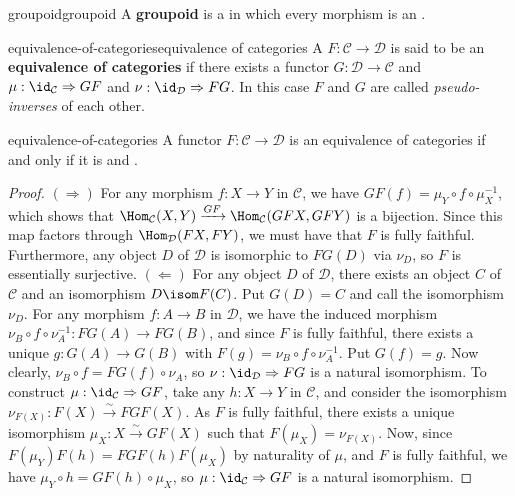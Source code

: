 \begin{topic}{groupoid}{groupoid}
    A \textbf{groupoid} is a  in which every morphism is an .
\end{topic}

\begin{topic}{equivalence-of-categories}{equivalence of categories}
    A  $F : \mathcal{C} \to \mathcal{D}$ is said to be an \textbf{equivalence of categories} if there exists a functor $G : \mathcal{D} \to \mathcal{C}$ and  $\mu : \id_\mathcal{C} \Rightarrow GF$ and $\nu : \id_\mathcal{D} \Rightarrow FG$. In this case $F$ and $G$ are called \textit{pseudo-inverses} of each other.
\end{topic}

\begin{example}{equivalence-of-categories}
    A functor $F : \mathcal{C} \to \mathcal{D}$ is an equivalence of categories if and only if it is   and .
    \begin{proof}
        $(\Rightarrow)$ For any morphism $f : X \to Y$ in $\mathcal{C}$, we have $GF(f) = \mu_Y \circ f \circ \mu_X^{-1}$, which shows that $\Hom_\mathcal{C}(X, Y) \xrightarrow{GF} \Hom_\mathcal{C}(GFX, GFY)$ is a bijection. Since this map factors through $\Hom_\mathcal{D}(FX, FY)$, we must have that $F$ is fully faithful. Furthermore, any object $D$ of $\mathcal{D}$ is isomorphic to $FG(D)$ via $\nu_D$, so $F$ is essentially surjective.
        $(\Leftarrow)$ For any object $D$ of $\mathcal{D}$, there exists an object $C$ of $\mathcal{C}$ and an isomorphism $D \isom F(C)$. Put $G(D) = C$ and call the isomorphism $\nu_D$. For any morphism $f : A \to B$ in $\mathcal{D}$, we have the induced morphism $\nu_B \circ f \circ \nu_A^{-1} : FG(A) \to FG(B)$, and since $F$ is fully faithful, there exists a unique $g : G(A) \to G(B)$ with $F(g) = \nu_B \circ f \circ \nu_A^{-1}$. Put $G(f) = g$. Now clearly, $\nu_B \circ f = FG(f) \circ \nu_A$, so $\nu : \id_\mathcal{D} \Rightarrow FG$ is a natural isomorphism. To construct $\mu : \id_\mathcal{C} \Rightarrow GF$, take any $h : X \to Y$ in $\mathcal{C}$, and consider the isomorphism $\nu_{F(X)} : F(X) \xrightarrow{\sim} FGF(X)$. As $F$ is fully faithful, there exists a unique isomorphism $\mu_X : X \xrightarrow{\sim} GF(X)$ such that $F(\mu_X) = \nu_{F(X)}$. Now, since $F(\mu_Y) F(h) = FGF(h) F(\mu_X)$ by naturality of $\mu$, and $F$ is fully faithful, we have $\mu_Y \circ h = GF(h) \circ \mu_X$, so $\mu : \id_\mathcal{C} \Rightarrow GF$ is a natural isomorphism.
    \end{proof}
\end{example}

